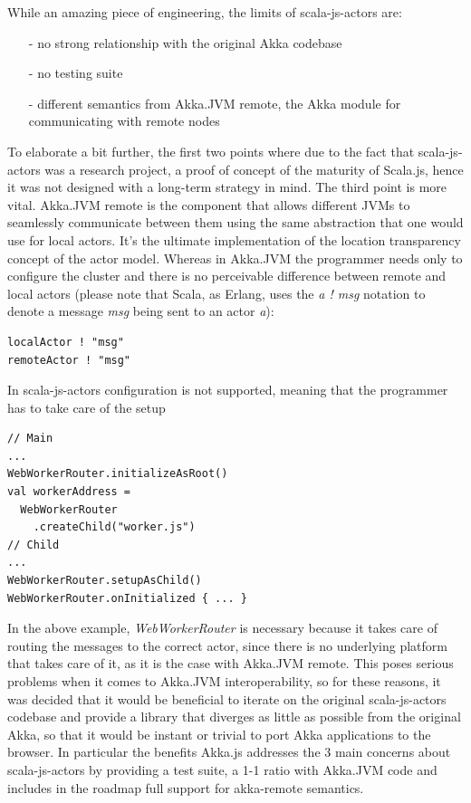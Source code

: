 \documentclass{sig-alternate}
\begin{document}
While an amazing piece of engineering, the limits of scala-js-actors are:
\begin{itemize}
\item[-] no strong relationship with the original Akka codebase
\item[-] no testing suite
\item[-] different semantics from Akka.JVM remote, the Akka module for communicating with remote nodes
\end{itemize}
To elaborate a bit further, the first two points where due to the fact that scala-js-actors was a research project, a proof of concept of the maturity of Scala.js, hence it was not designed with a long-term strategy in mind.
The third point is more vital. Akka.JVM remote is the component that allows different JVMs to seamlessly communicate between them using the same abstraction that one would use for local actors. It's the ultimate implementation of the location transparency concept of the actor model.
Whereas in Akka.JVM the programmer needs only to configure the cluster and there is no perceivable difference between
remote and local actors (please note that Scala, as Erlang, uses the \emph{a ! msg} notation to denote a message \emph{msg}
being sent to an actor \emph{a}):
\begin{lstlisting}
localActor ! "msg"
remoteActor ! "msg"
\end{lstlisting}
In scala-js-actors configuration is not supported, meaning that the programmer has to take care of the setup
\begin{lstlisting}
// Main
...
WebWorkerRouter.initializeAsRoot()
val workerAddress =
  WebWorkerRouter
    .createChild("worker.js")
// Child
...
WebWorkerRouter.setupAsChild()
WebWorkerRouter.onInitialized { ... }
\end{lstlisting}
In the above example, \emph{WebWorkerRouter} is necessary because it takes care of routing the messages to the
correct actor, since there is no underlying platform that takes care of it, as it is the case with Akka.JVM remote.
This poses serious problems when it comes to Akka.JVM interoperability, so for these reasons, it was decided
that it would be beneficial to iterate on the original scala-js-actors codebase and provide a library that
diverges as little as possible from the original Akka, so that it would be instant or trivial to port Akka
applications to the browser.
In particular the benefits Akka.js addresses the 3 main concerns about scala-js-actors by providing a
test suite, a 1-1 ratio with Akka.JVM code and includes in the roadmap full support for akka-remote
semantics.
\end{document}
